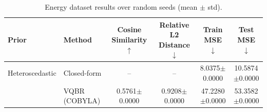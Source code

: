 \begin{table}[t]
\centering
\caption{Energy dataset results over random seeds (mean $\pm$ std).}
\begin{tabular}{llcccc}
\toprule
Prior & Method & Cosine Similarity $\uparrow$ & Relative L2 Distance $\downarrow$ & Train MSE $\downarrow$ & Test MSE $\downarrow$ \\
\midrule
Heteroscedastic & Closed-form & -- & -- & 8.0375$\pm$0.0000 & 10.5874$\pm$0.0000 \\
 & VQBR (COBYLA) & 0.5761$\pm$0.0000 & 0.9208$\pm$0.0000 & 47.2280$\pm$0.0000 & 53.3582$\pm$0.0000 \\
\bottomrule
\end{tabular}
\end{table}
